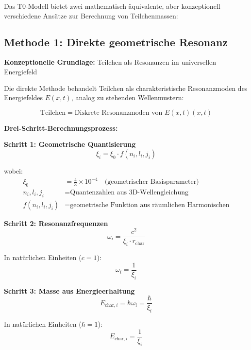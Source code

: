 \documentclass[12pt,a4paper]{report}
\newcommand{\Efield}{E(x,t)}              %
\begin{document}
Das T0-Modell bietet zwei mathematisch äquivalente, aber konzeptionell verschiedene Ansätze zur Berechnung von Teilchenmassen:

\subsection{Methode 1: Direkte geometrische Resonanz}
\label{subsec:direct_geometric_method}

\textbf{Konzeptionelle Grundlage:} Teilchen als Resonanzen im universellen Energiefeld

Die direkte Methode behandelt Teilchen als charakteristische Resonanzmoden des Energiefeldes $\Efield$, analog zu stehenden Wellenmustern:

\begin{equation}
	\text{Teilchen} = \text{Diskrete Resonanzmoden von } \Efield(x,t)
\end{equation}

\textbf{Drei-Schritt-Berechnungsprozess:}

\textbf{Schritt 1: Geometrische Quantisierung}
\begin{equation}
	\xi_i = \xi_0 \cdot f(n_i, l_i, j_i)
	\label{eq:geometric_quantization}
\end{equation}

wobei:
\begin{align}
	\xi_0 &= \frac{4}{3} \times 10^{-4} \quad \text{(geometrischer Basisparameter)} \\
	n_i, l_i, j_i &= \text{Quantenzahlen aus 3D-Wellengleichung} \\
	f(n_i, l_i, j_i) &= \text{geometrische Funktion aus räumlichen Harmonischen}
\end{align}

\textbf{Schritt 2: Resonanzfrequenzen}
\begin{equation}
	\omega_i = \frac{c^2}{\xi_i \cdot r_{\text{char}}}
	\label{eq:resonance_frequencies}
\end{equation}

In natürlichen Einheiten ($c = 1$):
\begin{equation}
	\omega_i = \frac{1}{\xi_i}
\end{equation}

\textbf{Schritt 3: Masse aus Energieerhaltung}
\begin{equation}
	E_{\text{char},i} = \hbar \omega_i = \frac{\hbar}{\xi_i}
	\label{eq:energy_from_frequency}
\end{equation}

In natürlichen Einheiten ($\hbar = 1$):
\begin{equation}
	\boxed{E_{\text{char},i} = \frac{1}{\xi_i}}
	\label{eq:characteristic_energy_direct}
\end{equation}
\end{document}
